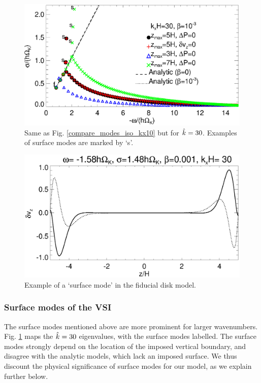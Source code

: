 \begin{figure}
  \includegraphics[width=\linewidth]{figures/compare_modes_iso_kx30_analytic.ps}
  \caption{Same as Fig. \ref{compare_modes_iso_kx10} but for
    $\hat{k}=30$. Examples of surface modes are 
    marked by `s'. \label{compare_modes_iso_kx30}
  }
\end{figure}


\begin{figure}
  \includegraphics[width=\linewidth,clip=true,trim=0cm 0cm 0cm
  0cm]{figures/eigenvectorvz_iso_surf}
  \caption{Example of a `surface mode' in the fiducial disk model.
    \label{lowfreq_eigenfunc_surf}
  }
\end{figure}

\subsubsection{Surface modes of the VSI}\label{surf_comment} 
The surface modes mentioned above are more prominent for larger
wavenumbers. Fig. \ref{compare_modes_iso_kx30} maps the $\hat{k} = 30$
eigenvalues, with the surface modes labelled.  The surface modes
strongly depend on the location of the imposed vertical boundary, and
disagree with the analytic models, which lack an imposed surface. We
thus discount the physical significance of surface modes for our
model, as we explain further below.  


